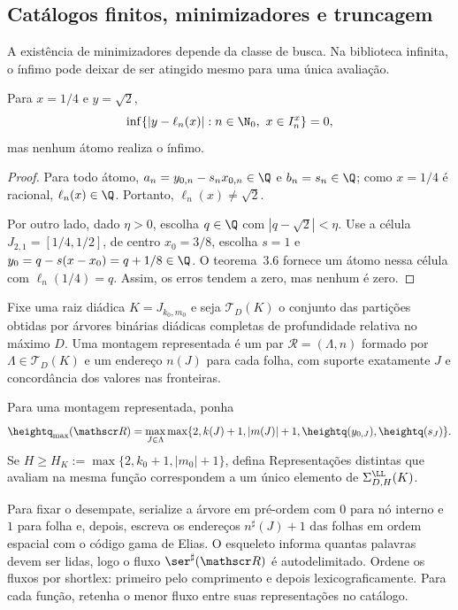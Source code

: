 \subsection{Catálogos finitos, minimizadores e truncagem}
A existência de minimizadores depende da classe de busca. Na biblioteca infinita, o ínfimo pode deixar de ser atingido mesmo para uma única avaliação.
\begin{proposicao}
Para $x=1/4$ e $y=\sqrt2$,
\[
\inf\{|y-\ell_n(x)|:n\in\N_0,\ x\in I_n^x\}=0,
\]
mas nenhum átomo realiza o ínfimo.
\end{proposicao}
\begin{proof}
Para todo átomo, $a_n=y_{0,n}-s_nx_{0,n}\in\Q$ e $b_n=s_n\in\Q$; como $x=1/4$ é racional, $\ell_n(x)\in\Q$. Portanto, $\ell_n(x)\ne\sqrt2$.

Por outro lado, dado $\eta>0$, escolha $q\in\Q$ com $|q-\sqrt2|<\eta$. Use a célula $J_{2,1}=[1/4,1/2]$, de centro $x_0=3/8$, escolha $s=1$ e $y_0=q-s(x-x_0)=q+1/8\in\Q$. O teorema~3.6 fornece um átomo nessa célula com $\ell_n(1/4)=q$. Assim, os erros tendem a zero, mas nenhum é zero.
\end{proof}
Fixe uma raiz diádica $K=J_{k_0,m_0}$ e seja $\mathcal T_D(K)$ o conjunto das partições obtidas por árvores binárias diádicas completas de profundidade relativa no máximo $D$. Uma montagem representada é um par $\mathscr R=(\Lambda,n)$ formado por $\Lambda\in\mathcal T_D(K)$ e um endereço $n(J)$ para cada folha, com suporte exatamente $J$ e concordância dos valores nas fronteiras.

\begin{definicao}
Para uma montagem representada, ponha
\[
\heightq_{\max}(\mathscr R)=
\max_{J\in\Lambda}\max\{2,k(J)+1,|m(J)|+1,\heightq(y_{0,J}),\heightq(s_J)\}.
\]
Se $H\ge H_K:=\max\{2,k_0+1,|m_0|+1\}$, defina
Representações distintas que avaliam na mesma função correspondem a um único elemento de $\Sigma^{\LL}_{D,H}(K)$.
\end{definicao}
Para fixar o desempate, serialize a árvore em pré-ordem com $0$ para nó interno e $1$ para folha e, depois, escreva os endereços $n^\sharp(J)+1$ das folhas em ordem espacial com o código gama de Elias. O esqueleto informa quantas palavras devem ser lidas, logo o fluxo $\ser^\sharp(\mathscr R)$ é autodelimitado. Ordene os fluxos por shortlex: primeiro pelo comprimento e depois lexicograficamente. Para cada função, retenha o menor fluxo entre suas representações no catálogo.

